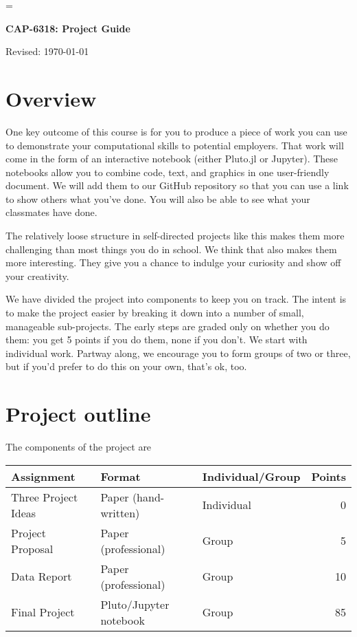 \documentclass[11pt]{article}
\begin{document}
\parskip=\bigskipamount
\parindent=0.0in
\thispagestyle{empty}


\bigskip\bigskip
\centerline{\Large \bf CAP-6318:  Project Guide}
\centerline{Revised: \today}

\section*{Overview}

One key outcome of this course is for you to produce a piece of work you can use
to demonstrate your computational skills to potential employers. That work will
come in the form of an interactive notebook (either Pluto.jl or Jupyter). These
notebooks allow you to combine code, text, and graphics in one user-friendly
document. We will add them to our GitHub repository so that you can use a link
to show others what you've done. You will also be able to see what your
classmates have done.

The relatively loose structure in self-directed projects like this makes them
more challenging than most things you do in school. We think that also makes
them more interesting. They give you a chance to indulge your curiosity and show
off your creativity.

We have divided the project into components to keep you on track. The intent is
to make the project easier by breaking it down into a number of small,
manageable sub-projects. The early steps are graded only on whether you do them:
you get 5 points if you do them, none if you don't. We start with individual
work.  Partway along, we encourage you to form groups of two or three, but if
you'd prefer to do this on your own, that's ok, too.


\section*{Project outline}

The components of the project are
%
\begin{center}
\begin{tabular}{lllr}
\toprule
Assignment                  & Format  & Individual/Group &  Points \\
\midrule
Three Project Ideas         & Paper (hand-written)  & Individual  & 0  \\
Project Proposal            & Paper (professional)  & Group       & 5  \\
Data Report                 & Paper (professional)  & Group       & 10  \\
Final Project               & Pluto/Jupyter notebook      & Group       & 85 \\
\bottomrule
\end{tabular}
\end{center}
\end{document}
